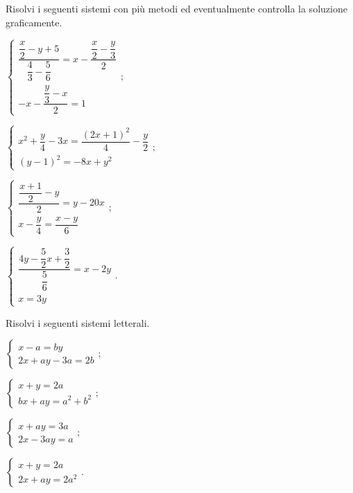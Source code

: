 \begin{esercizio}[\Ast]
 \label{ese:21.78}
 Risolvi i seguenti sistemi con più metodi ed eventualmente controlla
la soluzione graficamente.
\begin{multicols}{2}
\begin{enumeratea}
 {\longarray
\item $\left\{\begin{array}{l}\dfrac{\dfrac{x}{2}-y+5}{\dfrac{4}{3}-\dfrac{5}{6}}=x-\dfrac{\dfrac{x}{2}-\dfrac{y}{3}}{2}\\-x-\dfrac{\dfrac{y}{3}-x}{2}=1\end{array}\right.;$
\item $\left\{\begin{array}{l}x^{2}+\dfrac{y}{4}-3x=\dfrac{(2x+1)^{2}}{4}-\dfrac{y}{2}\\(y-1)^{2}=-8x+y^{2}\end{array}\right.;$
\item $\left\{\begin{array}{l}\dfrac{\dfrac{x+1}{2}-y}{2}=y-20x\\x-\dfrac{y}{4}=\dfrac{x-y}{6}\end{array}\right.;$
\item $\left\{\begin{array}{l}\dfrac{4y-\dfrac{5}{2}x+\dfrac{3}{2}}{\dfrac{5}{6}}=x-2y\\x=3y\end{array}\right..$}
\end{enumeratea}
\end{multicols}
\end{esercizio}

\begin{esercizio}[\Ast] %
 \label{ese:21.79}
 Risolvi i seguenti sistemi letterali.
\begin{multicols}{2}
\begin{enumeratea}
\item $\left\{\begin{array}{l}x-a=by \\2x+ay-3a=2b\end{array}\right.;$
\item $\left\{\begin{array}{l}x+y=2a \\bx+ay=a^{2}+b^{2} \end{array}\right.;$
\item $\left\{\begin{array}{l}x+ay=3a\\2x-3ay=a \end{array}\right.;$
\item $\left\{\begin{array}{l}x+y=2a\\2x+ay=2a^{2} \end{array}\right..$
\end{enumeratea}
\end{multicols}
\end{esercizio}

